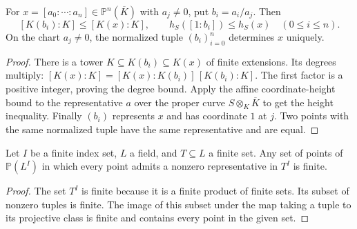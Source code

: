 \begin{lemma}
\label{lem:projective-chart-height-degree}
\leanok
For $x=[a_0:\cdots:a_n]\in\mathbb P^n(\overline K)$ with
$a_j\ne0$, put $b_i=a_i/a_j$. Then
\[
 [K(b_i):K]\leq[K(x):K],\qquad
 h_S([1:b_i])\leq h_S(x)\quad(0\leq i\leq n).
\]
On the chart $a_j\ne0$, the normalized tuple $(b_i)_{i=0}^n$
determines $x$ uniquely.
\end{lemma}
\begin{proof}
There is a tower $K\subseteq K(b_i)\subseteq K(x)$ of finite
extensions. Its degrees multiply:
$[K(x):K]=[K(x):K(b_i)]\,[K(b_i):K]$.
The first factor is a positive integer, proving the degree bound.
Apply the affine coordinate-height bound to the representative $a$
over the proper curve $S\otimes_K\overline K$ to get the height
inequality. Finally $(b_i)$ represents $x$ and has coordinate $1$
at $j$. Two points with the same normalized tuple have the same
representative and are equal.
\end{proof}

\begin{lemma}
\label{lem:finite-projective-representatives}
\leanok
Let $I$ be a finite index set, $L$ a field, and $T\subseteq L$ a
finite set. Any set of points of $\mathbb P(L^I)$ in which every
point admits a nonzero representative in $T^I$ is finite.
\end{lemma}
\begin{proof}
The set $T^I$ is finite because it is a finite product of finite
sets. Its subset of nonzero tuples is finite. The image of this
subset under the map taking a tuple to its projective class is
finite and contains every point in the given set.
\end{proof}

